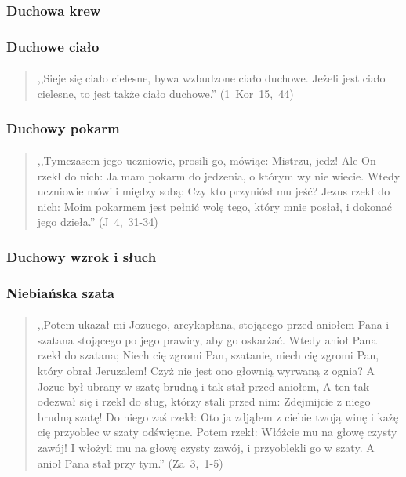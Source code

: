 \documentclass[10pt,a4paper,oneside]{article}
\begin{document}
\subsubsection{Duchowa krew}
\subsubsection{Duchowe ciało}
\paragraph{}
\begin{quote}
,,Sieje się ciało cielesne, bywa wzbudzone ciało duchowe. Jeżeli jest ciało cielesne, to jest także ciało duchowe.'' \mbox{(1 Kor 15, 44)}
\end{quote}
\subsubsection{Duchowy pokarm}
\paragraph{}
\begin{quote}
,,Tymczasem jego uczniowie, prosili go, mówiąc: Mistrzu, jedz! Ale On rzekł do nich: Ja mam pokarm do jedzenia, o którym wy nie wiecie. Wtedy uczniowie mówili między sobą: Czy kto przyniósł mu jeść? Jezus rzekł do nich: Moim pokarmem jest pełnić wolę tego, który mnie posłał, i dokonać jego dzieła.'' \mbox{(J 4, 31-34)}
\end{quote}
\subsubsection{Duchowy wzrok i słuch}
\subsubsection{Niebiańska szata}
\paragraph{}
\begin{quote}
,,Potem ukazał mi Jozuego, arcykapłana, stojącego przed aniołem Pana i szatana stojącego po jego prawicy, aby go oskarżać. Wtedy anioł Pana rzekł do szatana; Niech cię zgromi Pan, szatanie, niech cię zgromi Pan, który obrał Jeruzalem! Czyż nie jest ono głownią wyrwaną z ognia? A Jozue był ubrany w szatę brudną i tak stał przed aniołem, A ten tak odezwał się i rzekł do sług, którzy stali przed nim: Zdejmijcie z niego brudną szatę! Do niego zaś rzekł: Oto ja zdjąłem z ciebie twoją winę i każę cię przyoblec w szaty odświętne. Potem rzekł: Włóżcie mu na głowę czysty zawój! I włożyli mu na głowę czysty zawój, i przyoblekli go w szaty. A anioł Pana stał przy tym.'' \mbox{(Za 3, 1-5)}
\end{quote}
\end{document}
